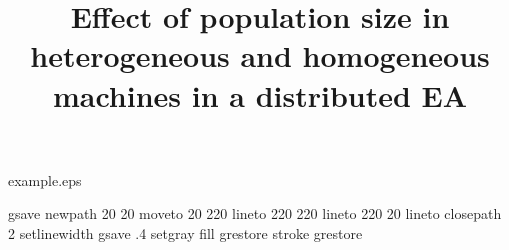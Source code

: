 %
%
%
%
%
\begin{filecontents*}{example.eps}





gsave
newpath
  20 20 moveto
  20 220 lineto
  220 220 lineto
  220 20 lineto
closepath
2 setlinewidth
gsave
  .4 setgray fill
grestore
stroke
grestore
\end{filecontents*}
%
\RequirePackage{fix-cm}
%
\documentclass[twocolumn]{svjour3}          %
%
\smartqed  %
%
\usepackage{graphicx}
\usepackage{color}
\usepackage{listings}
\usepackage{fancyvrb}
\usepackage{url}
\usepackage{fix2col}
\usepackage{natbib}
\usepackage{epsfig}
%

\lstset{
basicstyle=\ttfamily \scriptsize,
language=java,
frame=single,
stringstyle=\ttfamily,
showstringspaces=false
}

%
%
%
%
%
\providecommand{\e}[1]{\ensuremath{\times 10^{#1}}}


\title{Effect of population size in heterogeneous and homogeneous machines in a distributed EA%
}

